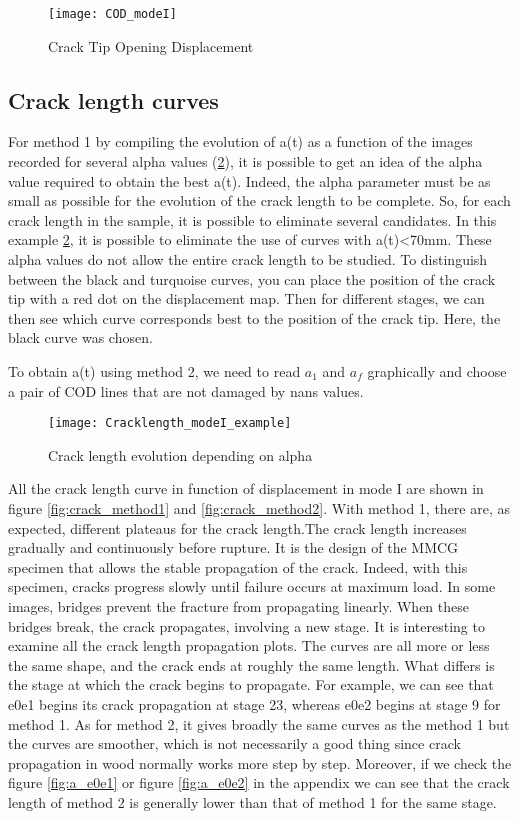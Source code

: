 \begin{figure}[htp]
	\centering
	\texttt{[image: COD\_modeI]}
	\caption{Crack Tip Opening Displacement}
	\label{fig:COD_modeI}
\end{figure}

\subsection{Crack length curves}

For method 1 by compiling the evolution of a(t) as a function of the images recorded for several alpha values (\ref{fig:Cracklength_modeI_example}), it is possible to get an idea of the alpha value required to obtain the best a(t). Indeed, the alpha parameter must be as small as possible for the evolution of the crack length to be complete. So, for each crack length in the sample, it is possible to eliminate several candidates. In this example \ref{fig:Cracklength_modeI_example}, it is possible to eliminate the use of curves with a(t)<70mm. These alpha values do not allow the entire crack length to be studied. To distinguish between the black and turquoise curves, you can place the position of the crack tip with a red dot on the displacement map. Then for different stages, we can then see which curve corresponds best to the position of the crack tip. Here, the black curve was chosen.

To obtain a(t) using method 2, we need to read $a_1$ and $a_f$ graphically and choose a pair of COD lines that are not damaged by nans values.

\begin{figure}[H]
	\centering
	\texttt{[image: Cracklength\_modeI\_example]}
	\caption{Crack length evolution depending on alpha}
	\label{fig:Cracklength_modeI_example}
\end{figure}

All the crack length curve in function of displacement in mode I are shown in figure \ref{fig:crack_method1} and \ref{fig:crack_method2}. 
With method 1, there are, as expected, different plateaus for the crack length.The crack length increases gradually and continuously before rupture. It is the design of the MMCG specimen that allows the stable propagation of the crack. Indeed, with this specimen, cracks progress slowly until failure occurs at maximum load. In some images, bridges prevent the fracture from propagating linearly. When these bridges break, the crack propagates, involving a new stage. It is interesting to examine all the crack length propagation plots.  The curves are all more or less the same shape, and the crack ends at roughly the same length. What differs is the stage at which the crack begins to propagate. For example, we can see that e0e1 begins its crack propagation at stage 23, whereas e0e2 begins at stage 9 for method 1.
As for method 2, it gives broadly the same curves as the method 1 but the curves are smoother, which is not necessarily a good thing since crack propagation in wood normally works more step by step. Moreover, if we check the figure \ref{fig:a_e0e1} or figure \ref{fig:a_e0e2} in the appendix  we can see that the crack length of method 2 is generally lower than that of method 1 for the same stage.

